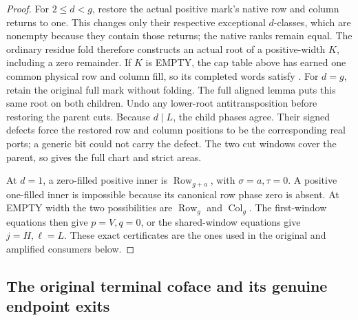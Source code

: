 \documentclass[11pt,a4paper]{amsart}
\numberwithin{equation}{section}
\theoremstyle{plain}
\theoremstyle{definition}
\newcommand{\Row}{\operatorname{Row}}
\newcommand{\Col}{\operatorname{Col}}
\begin{document}
\begin{proof}
For \(2\le d<g\), restore the actual positive mark's native
row and column returns to one.  This changes only their respective
exceptional \(d\)-classes, which are nonempty because they contain
those returns; the native ranks remain equal.  The ordinary residue fold
\cite[Ordinary residue fold]{Shields2026Gluing} therefore constructs
an actual root of a positive-width \(K\), including a zero remainder.
If \(K\) is EMPTY, the cap table above has earned one common physical
row and column fill, so its completed words satisfy
\cite[Empty residue fold]{Shields2026Gluing}.  For \(d=g\), retain
the original full mark without folding.  The full
aligned lemma puts this same root on both children.  Undo any lower-root
antitransposition before restoring the parent cuts.  Because \(d\mid L\),
the child phases agree.  Their signed defects force the restored row and
column positions to be the corresponding real ports; a generic bit
could not carry the defect.  The two cut windows cover the parent, so
\cite[Recovery from the generic words]{Shields2026Gluing} gives the full chart and strict areas.

At \(d=1\), a zero-filled positive inner is
\(\Row_{g+a}\), with \(\sigma=a,\tau=0\).  A positive one-filled
inner is impossible because its canonical row phase zero is absent.
At EMPTY width the two possibilities are \(\Row_g\) and \(\Col_g\).
The first-window equations then give \(p=V,q=0\), or the shared-window
equations give \(j=H,\ell=L\).  These exact certificates are the ones
used in the original and amplified consumers below.
\end{proof}

\subsection{The original terminal coface and its genuine endpoint exits}
\end{document}
